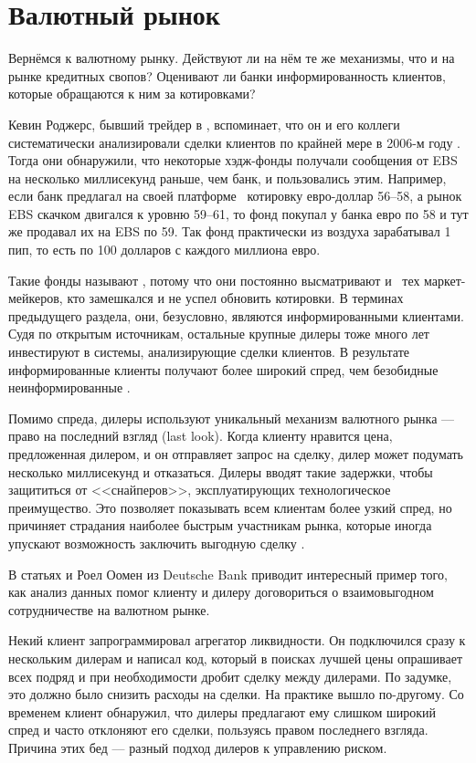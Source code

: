 \section*{Валютный рынок}

Вернёмся к валютному рынку. Действуют ли на нём те же механизмы, что и на рынке
кредитных свопов? Оценивают ли банки информированность клиентов, которые
обращаются к ним за котировками?

Кевин Роджерс, бывший трейдер в , вспоминает, что он и его
коллеги систематически анализировали сделки клиентов по крайней мере в 2006-м
году \cite[p.~84]{rodgers2016why}. Тогда они обнаружили, что некоторые
хэдж-фонды получали сообщения от EBS на несколько миллисекунд раньше, чем банк,
и пользовались этим. Например, если банк предлагал на своей платформе
\ котировку евро-доллар \num{56}--\num{58}, а рынок EBS скачком
двигался к уровню \num{59}--\num{61}, то фонд покупал у банка евро по \num{58} и
тут же продавал их на EBS по \num{59}. Так фонд практически из воздуха
зарабатывал 1 пип, то есть по 100 долларов с каждого миллиона евро.

Такие фонды называют , потому что они постоянно
высматривают и \ тех маркет-мейкеров, кто
замешкался и не успел обновить котировки. В терминах предыдущего раздела, они,
безусловно, являются информированными клиентами. Судя по открытым источникам,
остальные крупные дилеры тоже много лет инвестируют в системы, анализирующие
сделки клиентов. В результате информированные клиенты получают более широкий
спред, чем безобидные неинформированные \cite{wood2018}.

Помимо спреда, дилеры используют уникальный механизм валютного рынка --- право
на последний взгляд (last look). Когда клиенту нравится цена, предложенная
дилером, и он отправляет запрос на сделку, дилер может подумать несколько
миллисекунд и отказаться. Дилеры вводят такие задержки, чтобы защититься от
<<снайперов>>, эксплуатирующих технологическое преимущество. Это позволяет
показывать всем клиентам более узкий спред, но причиняет страдания наиболее
быстрым участникам рынка, которые иногда упускают возможность заключить выгодную
сделку \cite{cartea2019}.

В статьях \cite{oomen2017} и \cite{oomen2019} Роел Оомен из Deutsche Bank
приводит интересный пример того, как анализ данных помог клиенту и дилеру
договориться о взаимовыгодном сотрудничестве на валютном рынке.

Некий клиент запрограммировал агрегатор ликвидности. Он подключился сразу к
нескольким дилерам и написал код, который в поисках лучшей цены опрашивает всех
подряд и при необходимости дробит сделку между дилерами. По задумке, это должно
было снизить расходы на сделки. На практике вышло по-другому. Со временем клиент
обнаружил, что дилеры предлагают ему слишком широкий спред и часто отклоняют его
сделки, пользуясь правом последнего взгляда. Причина этих бед --- разный подход
дилеров к управлению риском.

